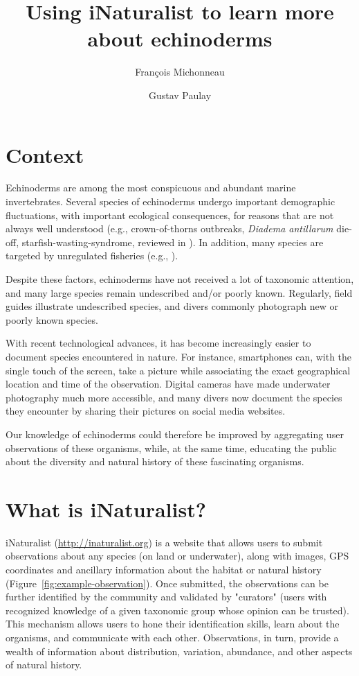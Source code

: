 \documentclass[11pt]{article}\usepackage[]{graphicx}\usepackage[]{color}
\title{Using iNaturalist to learn more about echinoderms}
\author{Fran\c{c}ois Michonneau}
\author{Gustav Paulay}
\affil{Florida Museum of Natural History, University of Florida, Gainesville,
  FL 32611-7800, USA; emails: francois.michonneau@gmail.com, paulay@flmnh.ufl.edu}
\date{}
\begin{document}
\maketitle


\section*{Context}

Echinoderms are among the most conspicuous and abundant marine
invertebrates. Several species of echinoderms undergo important demographic
fluctuations, with important ecological consequences, for reasons that are not
always well understood (e.g., crown-of-thorns outbreaks, \textit{Diadema
  antillarum} die-off, starfish-wasting-syndrome, reviewed in
\citealt{Uthicke2009}). In addition, many species are targeted by unregulated
fisheries (e.g., \citealt{Purcell2014}).

Despite these factors, echinoderms have not received a lot of taxonomic
attention, and many large species remain undescribed and/or poorly
known. Regularly, field guides illustrate undescribed species, and divers
commonly photograph new or poorly known species. 

With recent technological advances, it has become increasingly easier to
document species encountered in nature. For instance, smartphones can, with the
single touch of the screen, take a picture while associating the exact
geographical location and time of the observation. Digital cameras have made
underwater photography much more accessible, and many divers now document the
species they encounter by sharing their pictures on social media websites.

Our knowledge of echinoderms could therefore be improved by aggregating user
observations of these organisms, while, at the same time, educating the public
about the diversity and natural history of these fascinating organisms.

\section*{What is iNaturalist?}

iNaturalist (\href{http://inaturalist.org}{http://inaturalist.org}) is a website
that allows users to submit observations about any species (on land or
underwater), along with images, GPS coordinates and ancillary information about
the habitat or natural history (Figure~\ref{fig:example-observation}). Once
submitted, the observations can be further identified by the community and
validated by "curators" (users with recognized knowledge of a given taxonomic
group whose opinion can be trusted). This mechanism allows users to hone their
identification skills, learn about the organisms, and communicate with each
other. Observations, in turn, provide a wealth of information about
distribution, variation, abundance, and other aspects of natural history.
\end{document}
